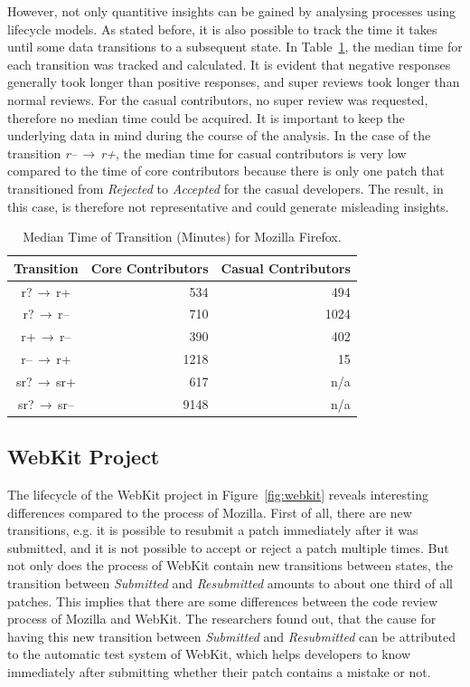 \documentclass[conference]{IEEEtran}
\begin{document}
However, not only quantitive insights can be gained by analysing processes using lifecycle models. As stated before, it is also possible to track the time it takes until some data transitions to a subsequent state. In Table~\ref{tab:mozilla}, the median time for each transition was tracked and calculated. It is evident that negative responses generally took longer than positive responses, and super reviews took longer than normal reviews. For the casual contributors, no super review was requested, therefore no median time could be acquired. It is important to keep the underlying data in mind during the course of the analysis. In the case of the transition \textit{r--$\,\to\,$r+}, the median time for casual contributors is very low compared to the time of core contributors because there is only one patch that transitioned from \textit{Rejected} to \textit{Accepted} for the casual developers. The result, in this case, is therefore not representative and could generate misleading insights.

\begin{table}[htbp]
\caption{Median Time of Transition (Minutes) for Mozilla Firefox\cite{baysal2015synthesizing}.}
\begin{center}
\begin{tabular}{|c|r|r|}
\hline
\textbf{Transition} & \textbf{Core Contributors} & \textbf{Casual Contributors} \\
\hline
r?$\,\to\,$r+ & 534 & 494 \\
\hline
r?$\,\to\,$r-- & 710 & 1024 \\
\hline
r+$\,\to\,$r-- & 390 & 402 \\
\hline
r--$\,\to\,$r+ & 1218 & 15 \\
\hline
sr?$\,\to\,$sr+ & 617 & n/a \\
\hline
sr?$\,\to\,$sr-- & 9148 & n/a \\
\hline
\end{tabular}
\label{tab:mozilla}
\end{center}
\end{table}

\subsection{WebKit Project}

The lifecycle of the WebKit project in Figure~\ref{fig:webkit} reveals interesting differences compared to the process of Mozilla. First of all, there are new transitions, e.g. it is possible to resubmit a patch immediately after it was submitted, and it is not possible to accept or reject a patch multiple times. But not only does the process of WebKit contain new transitions between states, the transition between \textit{Submitted} and \textit{Resubmitted} amounts to about one third of all patches. This implies that there are some differences between the code review process of Mozilla and WebKit. The researchers found out, that the cause for having this new transition between \textit{Submitted} and \textit{Resubmitted} can be attributed to the automatic test system of WebKit, which helps developers to know immediately after submitting whether their patch contains a mistake or not\cite{baysal2015synthesizing}.
\end{document}
